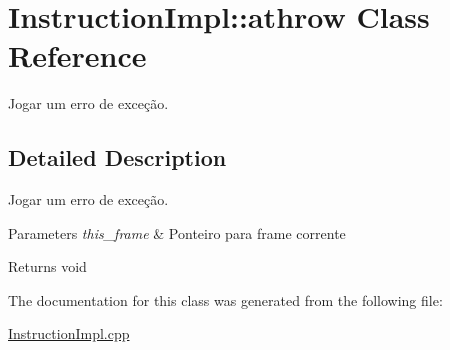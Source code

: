 \hypertarget{class_instruction_impl_1_1athrow}{}\section{Instruction\+Impl\+:\+:athrow Class Reference}
\label{class_instruction_impl_1_1athrow}


Jogar um erro de exceção.  




\subsection{Detailed Description}
Jogar um erro de exceção. 


\begin{DoxyParams}{Parameters}
{\em this\+\_\+frame} & Ponteiro para frame corrente \\
\hline
\end{DoxyParams}
\begin{DoxyReturn}{Returns}
void 
\end{DoxyReturn}


The documentation for this class was generated from the following file\+:\begin{DoxyCompactItemize}
\item 
\hyperlink{_instruction_impl_8cpp}{Instruction\+Impl.\+cpp}\end{DoxyCompactItemize}
